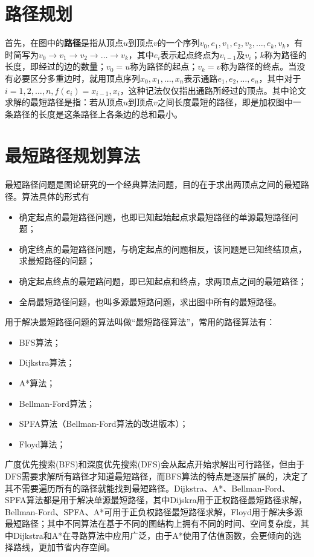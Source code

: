 \section{路径规划}
首先，在图中的\textbf{路径}是指从顶点$u$到顶点$v$的一个序列$v_0,e_1,v_1,e_2,v_2,\dots,e_k,v_k$，有时简写为$v_0\rightarrow v_1\rightarrow v_2\rightarrow\dots\rightarrow v_k$，其中$e_i$表示起点终点为$v_{i-1}$及$v_i$；$k$称为路径的长度，即经过的边的数量；$v_0=u$称为路径的起点；$v_k=v$称为路径的终点。当没有必要区分多重边时，就用顶点序列$x_0,x_1,\dots, x_n$表示通路$e_1,e_2,\dots,e_n$，其中对于$i=1,2,\dots,n,f(e_i)={x_{i-1}, x_i}$，这种记法仅仅指出通路所经过的顶点。其中论文求解的最短路径是指：若从顶点$u$到顶点$v$之间长度最短的路径，即是加权图中一条路径的长度是这条路径上各条边的总和最小。
\section{最短路径规划算法}
最短路径问题是图论研究的一个经典算法问题，目的在于求出两顶点之间的最短路径。算法具体的形式有
\begin{itemize}
    \item 确定起点的最短路径问题，也即已知起始起点求最短路径的单源最短路径问题；
    \item 确定终点的最短路径问题，与确定起点的问题相反，该问题是已知终结顶点，求最短路径的问题；
    \item 确定起点终点的最短路问题，即已知起点和终点，求两顶点之间的最短路径；
    \item 全局最短路径问题，也叫多源最短路问题，求出图中所有的最短路径。
\end{itemize}
\par 用于解决最短路径问题的算法叫做“最短路径算法”，常用的路径算法有：
\begin{itemize}
    \item BFS算法；
    \item Dijkstra算法；
    \item A*算法；
    \item Bellman-Ford算法；
    \item SPFA算法（Bellman-Ford算法的改进版本）；
    \item Floyd算法；
\end{itemize}
\par 广度优先搜索(BFS)和深度优先搜索(DFS)会从起点开始求解出可行路径，但由于DFS需要求解所有路径才知道最短路径，而BFS算法的特点是逐层扩展的，决定了其不需要遍历所有的路径就能找到最短路径。Dijkstra、A*、Bellman-Ford、SPFA算法都是用于解决单源最短路径，其中Dijskra用于正权路径最短路径求解，Bellman-Ford、SPFA、A*可用于正负权路径最短路径求解，Floyd用于解决多源最短路径；其中不同算法在基于不同的图结构上拥有不同的时间、空间复杂度，其中Dijkstra和A*在寻路算法中应用广泛，由于A*使用了估值函数，会更倾向的选择路线，更加节省内存空间。
